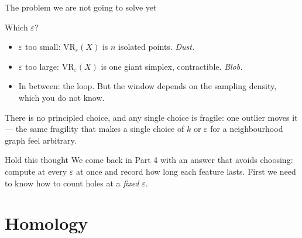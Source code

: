 \documentclass[10pt,aspectratio=169]{beamer}
\newcommand{\VR}{\mathrm{VR}}
\newcommand{\HL}[1]{\textcolor{blue!70!black}{#1}}
\begin{document}
    \begin{frame}{The problem we are not going to solve yet}
        \begin{center}
            \Large \alert{Which $\varepsilon$?}
        \end{center}

        \vspace{0.5em}
        \begin{itemize}
            \item $\varepsilon$ too small: $\VR_\varepsilon(X)$ is $n$ isolated points. \emph{Dust.}
            \item $\varepsilon$ too large: $\VR_\varepsilon(X)$ is one giant simplex,
            contractible. \emph{Blob.}
            \item In between: the loop. But the window depends on the sampling density,
            which you do not know.
        \end{itemize}

        \vspace{0.7em}

        There is no principled choice, and any single choice is fragile: one outlier moves it
        --- the same fragility that makes a single choice of $k$ or $\varepsilon$ for a
        neighbourhood graph feel arbitrary.

        \vspace{0.7em}
        \begin{alertblock}{Hold this thought}
            We come back in Part 4 with an answer that avoids choosing:
            \HL{compute at every $\varepsilon$ at once and record how long each feature lasts.}
            First we need to know how to count holes at a \emph{fixed} $\varepsilon$.
        \end{alertblock}
    \end{frame}

    \section{Homology}
\end{document}
